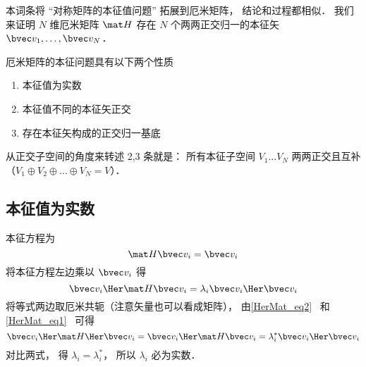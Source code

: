 
\begin{issues}
\issueTODO
\end{issues}


本词条将 “对称矩阵的本征值问题” 拓展到厄米矩阵， 结论和过程都相似． 我们来证明 $N$ 维厄米矩阵 $\mat H$ 存在 $N$ 个两两正交归一的本征矢 $\bvec v_1, \dots, \bvec v_N$．


\begin{theorem}{}
厄米矩阵的本征问题具有以下两个性质
\begin{enumerate}
\item 本征值为实数
\item 本征值不同的本征矢正交
\item 存在本征矢构成的正交归一基底
\end{enumerate}
\end{theorem}

从正交子空间的角度来转述 2,3 条就是： 所有本征子空间 $V_1 \dots V_N$ 两两正交且互补（$V_1\oplus V_2 \oplus\dots \oplus V_N = V$）．

\subsection{本征值为实数}
本征方程为
\begin{equation}
\mat H \bvec v_i = \bvec v_i
\end{equation}
将本征方程左边乘以 $\bvec v_i$ 得
\begin{equation}
\bvec v_i\Her \mat H \bvec v_i = \lambda_i \bvec v_i\Her \bvec v_i
\end{equation}
将等式两边取厄米共轭（注意矢量也可以看成矩阵）， 由\autoref{HerMat_eq2}~ 和\autoref{HerMat_eq1}~ 可得
\begin{equation}
\bvec v_i\Her \mat H\Her \bvec v_i = \bvec v_i\Her \mat H \bvec v_i = \lambda_i^* \bvec v_i\Her \bvec v_i
\end{equation}
对比两式， 得 $\lambda_i = \lambda_i^*$， 所以 $\lambda_i$ 必为实数．

